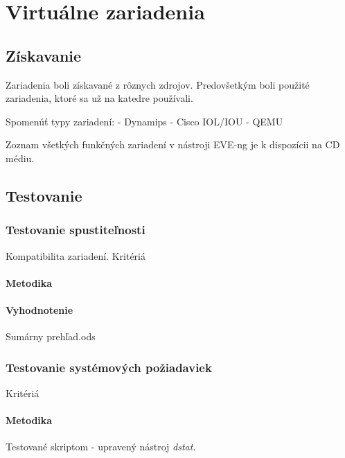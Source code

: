 \chapter{Virtuálne zariadenia}
\label{chap:virt_zariadenia}

\section{Získavanie}

Zariadenia boli získavané z rôznych zdrojov. Predovšetkým boli použité zariadenia, ktoré sa už na katedre používali.

Spomenúť typy zariadení:
  - Dynamips
  - Cisco IOL/IOU
  - QEMU
  
Zoznam všetkých funkčných zariadení v nástroji EVE-ng je k dispozícii na CD médiu.

\section{Testovanie}
\label{chap:testovanie_zariadeni}

\subsection{Testovanie spustiteľnosti}

Kompatibilita zariadení.
Kritériá

\subsubsection{Metodika}

\subsubsection{Vyhodnotenie}

Sumárny prehľad.ods

\subsection{Testovanie systémových požiadaviek}
\label{chap:testovanie_zariadeni_benchmark}

Kritériá

\subsubsection{Metodika}

Testované skriptom - upravený nástroj \emph{dstat}.


